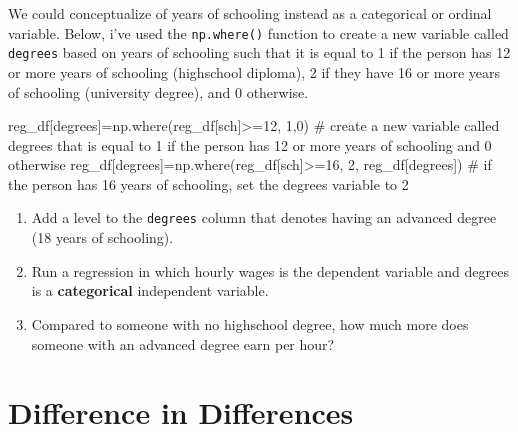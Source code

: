\documentclass[
  letterpaper,
  DIV=11,
  numbers=noendperiod]{scrreprt}
\newenvironment{Shaded}{\begin{snugshade}}{\end{snugshade}}
\newcommand{\CommentTok}[1]{\textcolor[rgb]{0.37,0.37,0.37}{#1}}
\newcommand{\DecValTok}[1]{\textcolor[rgb]{0.68,0.00,0.00}{#1}}
\newcommand{\NormalTok}[1]{\textcolor[rgb]{0.00,0.23,0.31}{#1}}
\newcommand{\OperatorTok}[1]{\textcolor[rgb]{0.37,0.37,0.37}{#1}}
\newcommand{\StringTok}[1]{\textcolor[rgb]{0.13,0.47,0.30}{#1}}
\providecommand{\tightlist}{%
  \setlength{\itemsep}{0pt}\setlength{\parskip}{0pt}}\usepackage{longtable,booktabs,array}
\begin{document}
We could conceptualize of years of schooling instead as a categorical or
ordinal variable. Below, i've used the \texttt{np.where()} function to
create a new variable called \texttt{degrees} based on years of
schooling such that it is equal to 1 if the person has 12 or more years
of schooling (highschool diploma), 2 if they have 16 or more years of
schooling (university degree), and 0 otherwise.

\begin{Shaded}
\begin{Highlighting}[]
\NormalTok{reg\_df[}\StringTok{\textquotesingle{}degrees\textquotesingle{}}\NormalTok{]}\OperatorTok{=}\NormalTok{np.where(reg\_df[}\StringTok{\textquotesingle{}sch\textquotesingle{}}\NormalTok{]}\OperatorTok{\textgreater{}=}\DecValTok{12}\NormalTok{, }\DecValTok{1}\NormalTok{,}\DecValTok{0}\NormalTok{) }\CommentTok{\# create a new variable called degrees that is equal to 1 if the person has 12 or more years of schooling and 0 otherwise}
\NormalTok{reg\_df[}\StringTok{\textquotesingle{}degrees\textquotesingle{}}\NormalTok{]}\OperatorTok{=}\NormalTok{np.where(reg\_df[}\StringTok{\textquotesingle{}sch\textquotesingle{}}\NormalTok{]}\OperatorTok{\textgreater{}=}\DecValTok{16}\NormalTok{, }\DecValTok{2}\NormalTok{, reg\_df[}\StringTok{\textquotesingle{}degrees\textquotesingle{}}\NormalTok{]) }\CommentTok{\# if the person has 16 years of schooling, set the degrees variable to 2}
\end{Highlighting}
\end{Shaded}

\begin{enumerate}
\def\labelenumi{\arabic{enumi}.}
\tightlist
\item
  Add a level to the \texttt{degrees} column that denotes having an
  advanced degree (18 years of schooling).
\item
  Run a regression in which hourly wages is the dependent variable and
  degrees is a \textbf{categorical} independent variable.
\item
  Compared to someone with no highschool degree, how much more does
  someone with an advanced degree earn per hour?
\end{enumerate}


\hypertarget{difference-in-differences}{%
\chapter{Difference in Differences}\label{difference-in-differences}}
\end{document}
